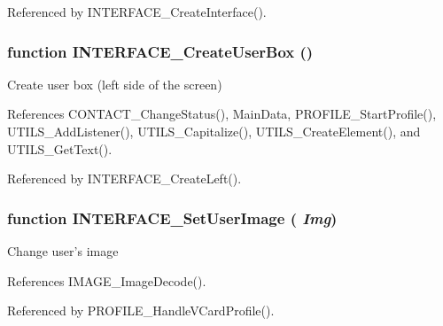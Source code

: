 Referenced by INTERFACE\_\-CreateInterface().
\subsubsection{\setlength{\rightskip}{0pt plus 5cm}function INTERFACE\_\-CreateUserBox ()}\label{left_8js_3fd128c6f241195f38df059e275858e5}


Create user box (left side of the screen) 

References CONTACT\_\-ChangeStatus(), MainData, PROFILE\_\-StartProfile(), UTILS\_\-AddListener(), UTILS\_\-Capitalize(), UTILS\_\-CreateElement(), and UTILS\_\-GetText().

Referenced by INTERFACE\_\-CreateLeft().
\subsubsection{\setlength{\rightskip}{0pt plus 5cm}function INTERFACE\_\-SetUserImage ( {\em Img})}\label{left_8js_21fc97ab34d09cf3c54dd41359a56574}


Change user's image 

References IMAGE\_\-ImageDecode().

Referenced by PROFILE\_\-HandleVCardProfile().
